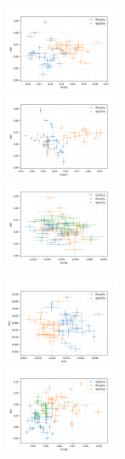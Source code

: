 \documentclass[10pt,a4paper,onecolumn]{article}
\theoremstyle{definition}
\theoremstyle{remark}
\begin{document}
\begin{figure}[htpb!]
	\begin{multicols}{3}
		\includegraphics[width=0.33\textwidth]{graficos/ADP_x_PRON.png}  \\
		\includegraphics[width=0.33\textwidth]{graficos/ADP_x_PUNCT.png}  \\
		\includegraphics[width=0.33\textwidth]{graficos/ADP_x_SCONJ.png}  \\
	\end{multicols}\vspace{-0.8cm}
	\begin{multicols}{3}
		\includegraphics[width=0.33\textwidth]{graficos/ADV_x_AUX.png}  \\
		\includegraphics[width=0.33\textwidth]{graficos/ADV_x_CCONJ.png}  \\

\end{multicols}
\end{figure}
\end{document}
